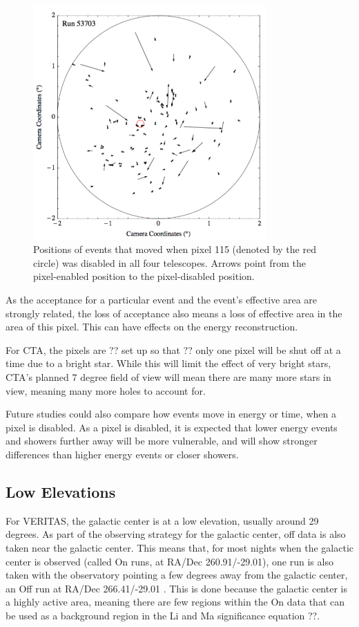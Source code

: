\begin{figure}[h]\label{fig:dpix_move}
  \begin{center}
    \includegraphics[width=0.8\textwidth]{images/disabled_pixel/moving_events}
    \caption[Event Movement]{Positions of events that moved when pixel 115 (denoted by the red circle) was disabled in all four telescopes.  Arrows point from the pixel-enabled position to the pixel-disabled position.}
  \end{center}
\end{figure}

As the acceptance for a particular event and the event's effective area are strongly related, the loss of acceptance also means a loss of effective area in the area of this pixel.
This can have effects on the energy reconstruction.

For CTA, the pixels are ?? set up so that ?? only one pixel will be shut off at a time due to a bright star.
While this will limit the effect of very bright stars, CTA's planned 7 degree field of view will mean there are many more stars in view, meaning many more holes to account for.

Future studies could also compare how events move in energy or time, when a pixel is disabled.
As a pixel is disabled, it is expected that lower energy events and showers further away will be more vulnerable, and will show stronger differences than higher energy events or closer showers.


\subsection{Low Elevations}
For VERITAS, the galactic center is at a low elevation, usually around 29 degrees.
As part of the observing strategy for the galactic center, off data is also taken near the galactic center.
This means that, for most nights when the galactic center is observed (called On runs, at RA/Dec 260.91/-29.01), one run is also taken with the observatory pointing a few degrees away from the galactic center, an Off run at RA/Dec 266.41/-29.01 .
This is done because the galactic center is a highly active area, meaning there are few regions within the On data that can be used as a background region in the Li and Ma significance equation ??.

